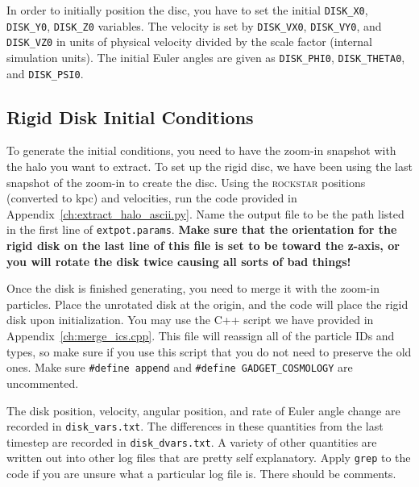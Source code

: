 In order to initially position the disc, you have to set the initial \texttt{DISK\_X0}, \texttt{DISK\_Y0}, \texttt{DISK\_Z0} variables. The velocity is set by \texttt{DISK\_VX0}, \texttt{DISK\_VY0}, and \texttt{DISK\_VZ0} in units of physical velocity divided by the scale factor (internal simulation units). The initial Euler angles are given as \texttt{DISK\_PHI0}, \texttt{DISK\_THETA0}, and \texttt{DISK\_PSI0}. 

\subsection{Rigid Disk Initial Conditions}

To generate the initial conditions, you need to have the zoom-in snapshot with the halo you want to extract. To set up the rigid disc, we have been using the last snapshot of the zoom-in to create the disc. Using the \textsc{rockstar} positions (converted to kpc) and velocities, run the code provided in Appendix~\ref{ch:extract_halo_ascii.py}. Name the output file to be the path listed in the first line of \texttt{extpot.params}. \textbf{Make sure that the orientation for the rigid disk on the last line of this file is set to be toward the z-axis, or you will rotate the disk twice causing all sorts of bad things!}

Once the disk is finished generating, you need to merge it with the zoom-in particles. Place the unrotated disk at the origin, and the code will place the rigid disk upon initialization. You may use the C++ script we have provided in Appendix~\ref{ch:merge_ics.cpp}. This file will reassign all of the particle IDs and types, so make sure if you use this script that you do not need to preserve the old ones. Make sure \texttt{\#define append} and \texttt{\#define GADGET\_COSMOLOGY} are uncommented.

The disk position, velocity, angular position, and rate of Euler angle change are recorded in \texttt{disk\_vars.txt}. The differences in these quantities from the last timestep are recorded in \texttt{disk\_dvars.txt}. A variety of other quantities are written out into other log files that are pretty self explanatory. Apply \texttt{grep} to the code if you are unsure what a particular log file is. There should be comments.



